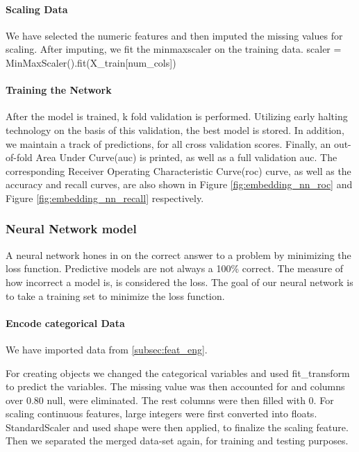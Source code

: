\documentclass[sigconf, nonacm]{acmart}
\begin{document}
\paragraph{Scaling Data}
We have selected the numeric features and then imputed the missing values for scaling. After imputing, we fit the minmaxscaler on the training data. 
scaler = MinMaxScaler().fit(X\_train[num\_cols])

\paragraph{Training the Network}
After the model is trained, k fold validation is performed. Utilizing early halting technology on the basis of this validation, the best model is stored. In addition, we maintain a track of predictions, for all cross validation scores. Finally, an out-of-fold Area Under Curve(auc) is printed, as well as a full validation auc. The corresponding Receiver Operating Characteristic Curve(roc) curve, as well as the accuracy and recall curves, are also shown in Figure \ref{fig:embedding_nn_roc} and Figure \ref{fig:embedding_nn_recall} respectively.

\subsubsection{Neural Network model\cite{neural_network_2021}}
 A neural network hones in on the correct answer to a problem by minimizing the loss function. Predictive models are not always a 100\% correct. The measure of how incorrect a model is, is considered the loss. The goal of our neural network is to take a training set to minimize the loss function.
\paragraph{Encode categorical Data}
We have imported data from \ref{subsec:feat_eng}.

For creating objects we changed the categorical variables and used fit\_transform to predict the variables.
The missing value was then accounted for and columns over 0.80 null, were eliminated. The rest columns were then filled with 0. 
For scaling continuous features, large integers were first converted into floats. StandardScaler and used shape were then applied, to finalize the scaling feature.
Then we separated the merged data-set again, for training and testing purposes.
\newline
\end{document}

